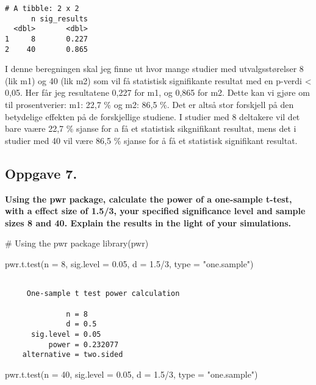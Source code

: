 \documentclass[
  letterpaper,
  DIV=11,
  numbers=noendperiod]{scrreprt}
\newenvironment{Shaded}{\begin{snugshade}}{\end{snugshade}}
\newcommand{\AttributeTok}[1]{\textcolor[rgb]{0.40,0.45,0.13}{#1}}
\newcommand{\CommentTok}[1]{\textcolor[rgb]{0.37,0.37,0.37}{#1}}
\newcommand{\DecValTok}[1]{\textcolor[rgb]{0.68,0.00,0.00}{#1}}
\newcommand{\FloatTok}[1]{\textcolor[rgb]{0.68,0.00,0.00}{#1}}
\newcommand{\FunctionTok}[1]{\textcolor[rgb]{0.28,0.35,0.67}{#1}}
\newcommand{\NormalTok}[1]{\textcolor[rgb]{0.00,0.23,0.31}{#1}}
\newcommand{\SpecialCharTok}[1]{\textcolor[rgb]{0.37,0.37,0.37}{#1}}
\newcommand{\StringTok}[1]{\textcolor[rgb]{0.13,0.47,0.30}{#1}}
\begin{document}
\begin{verbatim}
# A tibble: 2 x 2
      n sig_results
  <dbl>       <dbl>
1     8       0.227
2    40       0.865
\end{verbatim}

I denne beregningen skal jeg finne ut hvor mange studier med
utvalgsstørelser 8 (lik m1) og 40 (lik m2) som vil få statistisk
signifikante resultat med en p-verdi \textless{} 0,05. Her får jeg
resultatene 0,227 for m1, og 0,865 for m2. Dette kan vi gjøre om til
prosentverier: m1: 22,7 \% og m2: 86,5 \%. Det er altså stor forskjell
på den betydelige effekten på de forskjellige studiene. I studier med 8
deltakere vil det bare vaære 22,7 \% sjanse for a få et statistisk
sikgnifikant resultat, mens det i studier med 40 vil være 86,5 \% sjanse
for å få et statistisk signifikant resultat.

\subsection{Oppgave 7.}\label{oppgave-7.}

\textbf{Using the pwr package, calculate the power of a one-sample
t-test, with a effect size of 1.5/3, your specified significance level
and sample sizes 8 and 40. Explain the results in the light of your
simulations.}

\begin{Shaded}
\begin{Highlighting}[]
\CommentTok{\# Using the pwr package}
\FunctionTok{library}\NormalTok{(pwr)}

\FunctionTok{pwr.t.test}\NormalTok{(}\AttributeTok{n =} \DecValTok{8}\NormalTok{, }\AttributeTok{sig.level =} \FloatTok{0.05}\NormalTok{, }\AttributeTok{d =} \FloatTok{1.5}\SpecialCharTok{/}\DecValTok{3}\NormalTok{, }\AttributeTok{type =} \StringTok{"one.sample"}\NormalTok{)}
\end{Highlighting}
\end{Shaded}

\begin{verbatim}

     One-sample t test power calculation 

              n = 8
              d = 0.5
      sig.level = 0.05
          power = 0.232077
    alternative = two.sided
\end{verbatim}

\begin{Shaded}
\begin{Highlighting}[]
\FunctionTok{pwr.t.test}\NormalTok{(}\AttributeTok{n =} \DecValTok{40}\NormalTok{, }\AttributeTok{sig.level =} \FloatTok{0.05}\NormalTok{, }\AttributeTok{d =} \FloatTok{1.5}\SpecialCharTok{/}\DecValTok{3}\NormalTok{, }\AttributeTok{type =} \StringTok{"one.sample"}\NormalTok{)}
\end{Highlighting}
\end{Shaded}
\end{document}

